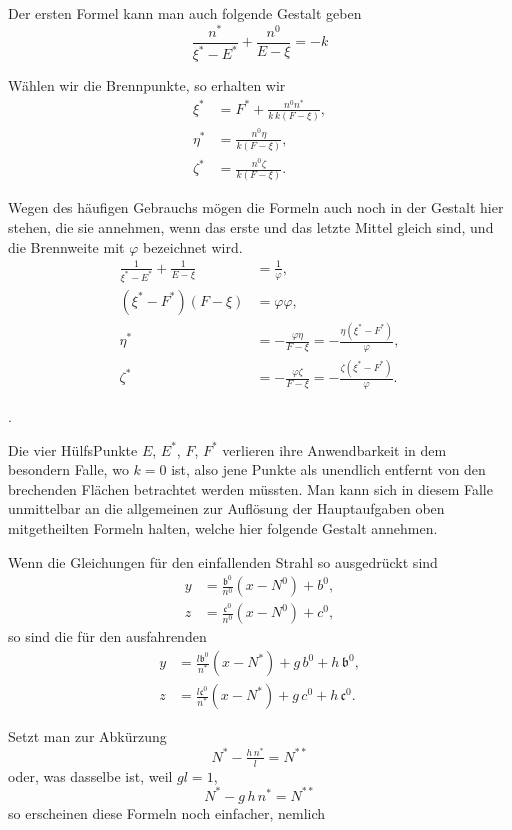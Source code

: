 \documentclass[11pt,a4paper]{article}
\begin{document}
Der ersten Formel kann man auch folgende Gestalt geben
\[
\frac{n^*}{\xi^* - E^*} + \frac{n^0}{E - \xi} = -k
\]

\newpage
\noindent
Wählen wir die Brennpunkte, so erhalten wir
\begin{align*}
\xi^* &= F^* + \frac{n^0 n^*}{k\,k(F - \xi)}, \\
\eta^* &= \frac{n^0 \eta}{k(F - \xi)}, \\
\zeta^* &= \frac{n^0 \zeta}{k(F - \xi)}.
\end{align*}

Wegen des häufigen Gebrauchs mögen die Formeln auch noch in der Gestalt hier stehen, die sie annehmen, wenn das erste und das letzte Mittel gleich sind, und die Brennweite mit $\varphi$ bezeichnet wird.
\begin{align*}
\tfrac{1}{\xi^* - E^*} + \tfrac{1}{E - \xi} &= \tfrac{1}{\varphi}, \\
(\xi^* - F^*)(F - \xi) &= \varphi\varphi, \\
\eta^* &= -\frac{\varphi\eta}{F - \xi} = -\frac{\eta(\xi^* - F^*)}{\varphi}, \\
\zeta^* &= -\frac{\varphi\zeta}{F - \xi} = -\frac{\zeta(\xi^* - F^*)}{\varphi}.
\end{align*}

\bigskip{}.

\smallskip
Die vier HülfsPunkte $E$, $E^*$, $F$, $F^*$ verlieren ihre Anwendbarkeit in dem besondern Falle, wo $k = 0$ ist, also jene Punkte als unendlich entfernt von den brechenden Flächen betrachtet werden müssten. Man kann sich in diesem Falle unmittelbar an die allgemeinen zur Auflösung der Hauptaufgaben oben mitgetheilten Formeln halten, welche hier folgende Gestalt annehmen.

Wenn die Gleichungen für den einfallenden Strahl so ausgedrückt sind
\begin{align*}
y &= \tfrac{\mathfrak{b}^0}{n^0}(x - N^0) + b^0, \\
z &= \tfrac{\mathfrak{c}^0}{n^0}(x - N^0) + c^0,
\end{align*}
so sind die für den ausfahrenden
\begin{align*}
y &= \tfrac{l\mathfrak{b}^0}{n^*}(x - N^*) + g\,b^0 + h\,\mathfrak{b}^0, \\
z &= \tfrac{l\mathfrak{c}^0}{n^*}(x - N^*) + g\,c^0 + h\,\mathfrak{c}^0.
\end{align*}

Setzt man zur Abkürzung
\[
N^* - \tfrac{h\,n^*}{l} = N^{**}
\]
oder, was dasselbe ist, weil $gl = 1$,
\[
N^* - g\,h\,n^* = N^{**}
\]
so erscheinen diese Formeln noch einfacher, nemlich
\end{document}

